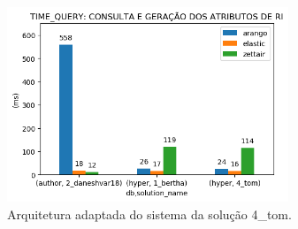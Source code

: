 \begin{figure}[h]
    \centering
    \caption{Arquitetura adaptada do sistema da solução 4\_tom.}
    \begin{center}
        \includegraphics[width=0.75\textwidth]{img/time-query.png}
    \end{center}
    \vspace{-0.5cm}
    \label{fig:4-tom-arquitetura-com-ri}
\end{figure}